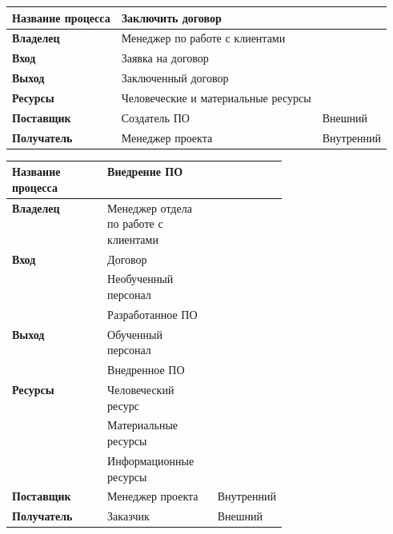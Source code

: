 \documentclass[a4paper,14pt]{extarticle}
\begin{document}
\begin{table}[htbp]
	\begin{center}
		\begin{tabular}{|l|l|l|}
			\hline
			\textbf{Название процесса} & Заключить договор &  \\ \hline
			\textbf{Владелец} & Менеджер по работе с клиентами &  \\ \hline
			\textbf{Вход} & Заявка на договор &  \\ \hline
			\textbf{Выход} & Заключенный договор &  \\ \hline
			\textbf{Ресурсы} & Человеческие и материальные ресурсы & \textbf{} \\ \hline
			\textbf{Поставщик} & Создатель ПО & Внешний \\ \hline
			\textbf{Получатель} & Менеджер проекта & Внутренний \\ \hline
		\end{tabular}
	\end{center}
	\label{}
\end{table}
\newpage
\fi

\newpage
{}

\begin{table}[h!]
	\begin{center}
		\begin{tabular}{|l|p{0.4\linewidth}|l|}
			\hline
			\textbf{Название процесса} & Внедрение ПО &  \\ \hline
			\textbf{Владелец} & {Менеджер   отдела по работе с клиентами} &  \\ \hline
			\multicolumn{ 1}{|l|}{\textbf{Вход}} & Договор &  \\ \cline{ 2- 3}
			\multicolumn{ 1}{|l|}{} & Необученный персонал &  \\ \cline{ 2- 3}
			\multicolumn{ 1}{|l|}{} & Разработанное ПО &  \\ \hline
			\multicolumn{ 1}{|l|}{\textbf{Выход}} & Обученный персонал &  \\ \cline{ 2- 3}
			\multicolumn{ 1}{|l|}{} & Внедренное ПО &  \\ \hline
			\multicolumn{ 1}{|l|}{\textbf{Ресурсы}} & Человеческий ресурс &  \\ \cline{ 2- 3}
			\multicolumn{ 1}{|l|}{} & Материальные ресурсы &  \\ \cline{ 2- 3}
			\multicolumn{ 1}{|l|}{} & Информационные ресурсы &  \\ \hline
			\multicolumn{ 1}{|l|}{\textbf{Поставщик}} & Менеджер проекта & Внутренний \\ \hline
			\textbf{Получатель} & Заказчик & Внешний \\ \hline
		\end{tabular}
	\end{center}
	\label{}
\end{table}
\end{document}
